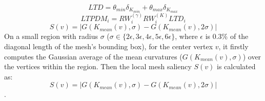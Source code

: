 \begin{equation}
LTD =\theta_{min} \delta_{K_{min}} +\theta_{max} \delta_{K_{max}}
\end{equation}
\begin{equation}
LTPDM_i =RW^{(\gamma)}_iRW^{(K)}_iLTD_i
\end{equation}
\begin{equation}
S(v)= |G(K_{mean}(v), \sigma) - G(K_{mean}(v), 2\sigma)|
\end{equation}
On a small region with radius $\sigma$ ($\sigma \in \{ 2\epsilon, 3\epsilon, 4\epsilon, 5\epsilon, 6\epsilon \}$, where $\epsilon$ is 0.3\% of the diagonal length of the mesh’s bounding box), for the center vertex $v$, it firstly computes the Gaussian average of the mean curvatures ($G(K_{mean}(v), \sigma)$) over the vertices within the region. Then the local mesh saliency $S(v)$ is calculated as:
\begin{equation}
S(v)= |G(K_{mean}(v), \sigma) - G(K_{mean}(v), 2\sigma)|
\end{equation}.
